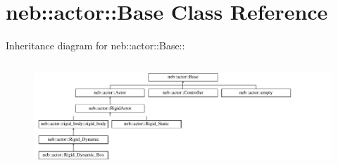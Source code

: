 \hypertarget{classneb_1_1actor_1_1Base}{
\section{neb::actor::Base Class Reference}
\label{classneb_1_1actor_1_1Base}
}
Inheritance diagram for neb::actor::Base::\begin{figure}[H]
\begin{center}
\leavevmode
\includegraphics[height=4.03846cm]{classneb_1_1actor_1_1Base}
\end{center}
\end{figure}
